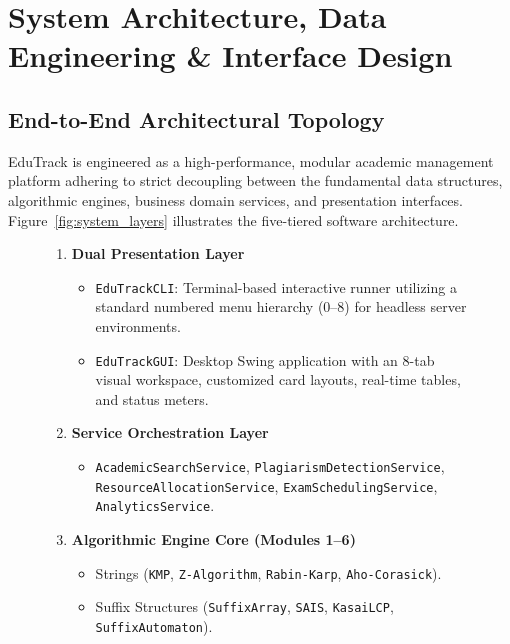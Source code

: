 \chapter{System Architecture, Data Engineering \& Interface Design}
\label{ch:system_architecture}

\section{End-to-End Architectural Topology}
EduTrack is engineered as a high-performance, modular academic management platform adhering to strict decoupling between the fundamental data structures, algorithmic engines, business domain services, and presentation interfaces. Figure~\ref{fig:system_layers} illustrates the five-tiered software architecture.

\begin{figure}[H]
\centering
\begin{tcolorbox}[colback=codebackground,colframe=primaryblue,title=\textbf{EduTrack Layered Architectural Topology}]
\begin{enumerate}[leftmargin=1.5cm]
    \item[\textbf{Tier 5:}] \textbf{Dual Presentation Layer}
    \begin{itemize}
        \item \texttt{EduTrackCLI}: Terminal-based interactive runner utilizing a standard numbered menu hierarchy ($0$--$8$) for headless server environments.
        \item \texttt{EduTrackGUI}: Desktop Swing application with an 8-tab visual workspace, customized card layouts, real-time tables, and status meters.
    \end{itemize}
    \item[\textbf{Tier 4:}] \textbf{Service Orchestration Layer}
    \begin{itemize}
        \item \texttt{AcademicSearchService}, \texttt{PlagiarismDetectionService}, \texttt{ResourceAllocationService}, \texttt{ExamSchedulingService}, \texttt{AnalyticsService}.
    \end{itemize}
    \item[\textbf{Tier 3:}] \textbf{Algorithmic Engine Core (Modules 1--6)}
    \begin{itemize}
        \item Strings (\texttt{KMP}, \texttt{Z-Algorithm}, \texttt{Rabin-Karp}, \texttt{Aho-Corasick}).
        \item Suffix Structures (\texttt{SuffixArray}, \texttt{SAIS}, \texttt{KasaiLCP}, \texttt{SuffixAutomaton}).

\end{itemize}
\end{enumerate}
\end{tcolorbox}
\end{figure}
